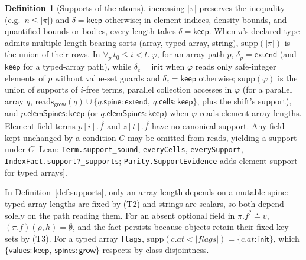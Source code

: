 \documentclass[10pt,a4paper]{article}
\theoremstyle{definition}
\newtheorem{definition}[theorem]{Definition}
\theoremstyle{remark}
\newcommand{\kw}[1]{\mathsf{#1}}
\newcommand{\keep}{\kw{keep}}
\newcommand{\init}{\kw{init}}
\newcommand{\extend}{\kw{extend}}
\newcommand{\grow}{\kw{grow}}
\newcommand{\val}{\kw{values}}
\newcommand{\st}{\kw{spines}}
\newcommand{\len}[1]{|#1|}
\newcommand{\code}[1]{\texttt{#1}}
\newcommand{\lean}[1]{\texttt{\small #1}}
\newcommand{\status}[1]{\textsf{\small[#1]}}
\begin{document}
\begin{definition}[Supports of the atoms]
increasing $\len\pi$ preserves the inequality (e.g.\ $n\le\len\pi$) and
$\delta=\keep$ otherwise; in element indices, density bounds, and
quantified bounds or bodies, every length takes $\delta=\keep$. When
$\pi$'s declared type admits multiple length-bearing sorts (array, typed
array, string), $\mathrm{supp}(\len\pi)$ is the union of their rows.
In $\forall_{p}\, t_0\le i<t.\ \varphi$, for an array path $p$,
$\delta_p=\extend$ (and $\keep$ for a typed-array path), while
$\delta_c=\init$ when $\varphi$ reads only safe-integer elements of $p$
without value-set guards and $\delta_c=\keep$ otherwise; $\mathrm{supp}(\varphi)$
is the union of supports of $i$-free terms, parallel collection accesses
in $\varphi$ (for a parallel array $q$, $\mathrm{reads}_{\grow}(q)\cup\{q.\kw{spine}:\extend,\ q.\kw{cells}:\keep\}$, plus the shift's support), and $p.\kw{elemSpines}:\keep$ (or $q.\kw{elemSpines}:\keep$) when $\varphi$ reads element array lengths. Element-field terms $p[i].\vec f$ and $z[t].\vec f$ have no canonical support. Any field kept unchanged by
a condition $C$ may be omitted from $\mathrm{reads}$, yielding a support
under $C$
\status{Lean: \lean{Term.support\_sound}, \lean{everyCells}, \lean{everySupport}, \lean{IndexFact.support?\_supports}; \lean{Parity.SupportEvidence} adds element support for typed arrays}.
\end{definition}

\noindent
In Definition~\ref{def:supports}, only an array length depends on a
mutable spine: typed-array lengths are fixed by (T2) and strings are
scalars, so both depend solely on the path reading them. For an absent
optional field in $\pi.f^{?}\doteq v$, $(\pi.f)(\rho,h)=\emptyset$, and
the fact persists because objects retain their fixed key sets by (T3).
For a typed array \code{flags},
$\mathrm{supp}(c.\mathit{at}<\len{\mathit{flags}})=\{c.\mathit{at}:\init\}$,
which $\{\val:\keep,\ \st:\grow\}$ respects by class disjointness.
\end{document}
